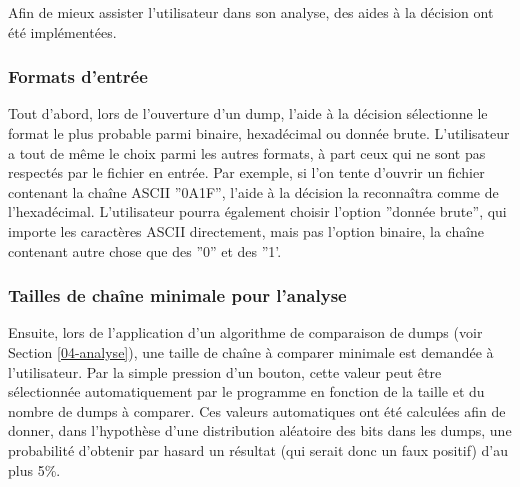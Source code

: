 Afin de mieux assister l'utilisateur dans son analyse, des aides à la décision ont été implémentées.

\subsubsection{Formats d'entrée}

Tout d'abord, lors de l'ouverture d'un dump, l'aide à la décision sélectionne le format le plus probable parmi binaire, hexadécimal ou donnée brute. L'utilisateur a tout de même le choix parmi les autres formats, à part ceux qui ne sont pas respectés par le fichier en entrée.
Par exemple, si l'on tente d'ouvrir un fichier contenant la chaîne ASCII ''0A1F'', l'aide à la décision la reconnaîtra comme de l'hexadécimal. L'utilisateur pourra également choisir l'option ''donnée brute'', qui importe les caractères ASCII directement, mais pas l'option binaire, la chaîne contenant autre chose que des ''0'' et des ''1'.

\subsubsection{Tailles de chaîne minimale pour l'analyse}

Ensuite, lors de l'application d'un algorithme de comparaison de dumps (voir Section \ref{04-analyse}), une taille de chaîne à comparer minimale est demandée à l'utilisateur. Par la simple pression d'un bouton, cette valeur peut être sélectionnée automatiquement par le programme en fonction de la taille et du nombre de dumps à comparer.
Ces valeurs automatiques ont été calculées afin de donner, dans l'hypothèse d'une distribution aléatoire des bits dans les dumps, une probabilité d'obtenir par hasard un résultat (qui serait donc un faux positif) d'au plus 5\%.
